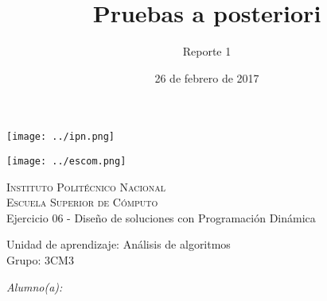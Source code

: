\documentclass[12pt]{article}
\date{26 de febrero de 2017}
\title{Pruebas a posteriori}
\author{Reporte 1}
\begin{document}
\begin{titlepage}
            \begin{center}
                \noindent
                \begin{minipage}{0.5\textwidth}
                    \begin{flushleft} \large
                        \texttt{[image: ../ipn.png]}
                    \end{flushleft}
                \end{minipage}%
                \begin{minipage}{0.55\textwidth}
                    \begin{flushright} \large
                        \texttt{[image: ../escom.png]}
                    \end{flushright}
                \end{minipage}
                
                \textsc{\LARGE Instituto Politécnico Nacional}\\[0.5cm]
                
                \textsc{\Large Escuela Superior de Cómputo}\\[1cm]
                
                
                { \huge Ejercicio 06 - Diseño de soluciones con Programación Dinámica \\[1cm] }
                
                { \Large Unidad de aprendizaje: Análisis de algoritmos} \\[1cm]
                
                { \Large Grupo: 3CM3 } \\[1cm]
                
                \noindent
                \begin{minipage}{0.5\textwidth}
                    \begin{flushleft} \large
                        \emph{Alumno(a):}\\
                        

\end{flushleft}
\end{minipage}
\end{center}
\end{titlepage}
\end{document}

